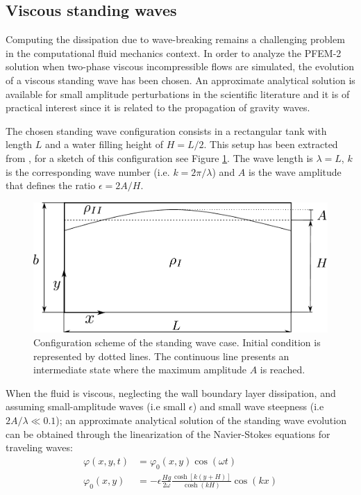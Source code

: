 \subsection{Viscous standing waves}%

Computing the dissipation due to wave-breaking remains a challenging problem in the computational fluid mechanics context. In order to analyze the PFEM-2 solution when two-phase viscous incompressible flows are simulated, the evolution of a viscous standing wave has been chosen. An approximate analytical solution is available for small amplitude perturbations in the scientific literature \cite{Lighthill01} and it is of practical interest since it is related to the propagation of gravity waves.

The chosen standing wave configuration consists in a rectangular tank with length $L$ and a water filling height of $H = L/2$. This setup has been extracted from \cite{Colagrossi12}, for a sketch of this configuration see Figure \ref{fg:standing-wave-config}. The wave length is $\lambda = L$, $k$ is the corresponding wave number (i.e. $k = 2\pi/\lambda$) and $A$ is the wave amplitude that defines the ratio $\epsilon=2A/H$.

\begin{figure}[H]
  \begin{center}
      \includegraphics[width=.7\columnwidth]{../images/standing_wave.pdf}
  \end{center}
  \caption{\label{fg:standing-wave-config} Configuration scheme of the standing wave case. Initial condition is represented by dotted lines. The continuous line presents an intermediate state where the maximum amplitude $A$ is reached.}
\end{figure}

When the fluid is viscous, neglecting the wall boundary layer dissipation, and assuming small-amplitude waves (i.e small $\epsilon$) and small wave steepness (i.e $2A/\lambda \ll 0.1$); an approximate analytical solution of the standing wave evolution can be obtained through the linearization of the Navier-Stokes equations for traveling waves:
\begin{align}
 \varphi(x,y,t) & = \varphi_0(x,y)\cos(\omega t) \\
 \varphi_0(x,y) & =-\epsilon\frac{Hg}{2\omega}\frac{\cosh\left[k(y+H)\right]}{\cosh(kH)}\cos(kx)
\end{align}

